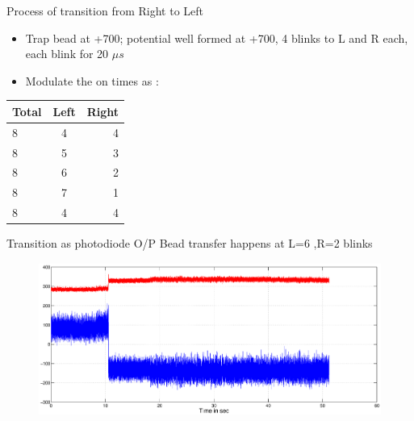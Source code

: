 \documentclass{beamer}
\begin{document}
\begin{frame}{Process of transition from Right to Left} 

\begin{itemize}

\item Trap bead at +700; potential well formed at +700, 4 blinks to L and R each, each blink for 20 $\mu s$
\item Modulate the on times as :
\end{itemize}
\begin{center} 
\begin{tabular}{| l | c | r |} 
\hline Total & Left & Right \\ 
\hline 8 & 4 & 4 \\ 
\hline 8 & 5 & 3 \\ 
\hline 8 & 6 & 2 \\ 
\hline 8 & 7 & 1 \\ 
\hline \hline 8 & 4 & 4 \\ 
\hline \end{tabular} 
\end{center}

\end{frame}

\begin{frame}{Transition as photodiode O/P} 
Bead transfer happens at L=6 ,R=2 blinks
\begin{figure}
    \centering
    \includegraphics[height=5cm,width=12cm]{I4k_transfer_xb_6.eps}
    \label{fig:graph23}
\end{figure}

\end{frame}
\end{document}
